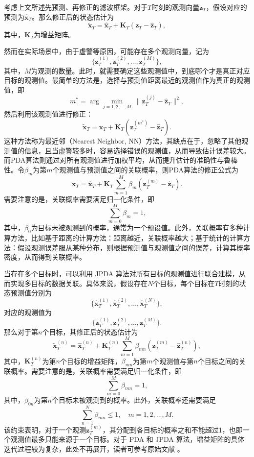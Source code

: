 考虑上文所述先预测、再修正的滤波框架。对于\( T \)时刻的观测向量\( \bm{z}_T \)，假设对应的预测为\( \hat{\bm{x}}_T \)。那么修正后的状态估计为
\[
    \tilde{\bm{x}}_T = \hat{\bm{x}}_T + \mathbf{K}_T (\bm{z}_T - \hat{\bm{z}}_T),
\]
其中，\( \mathbf{K}_T \)为增益矩阵。

然而在实际场景中，由于虚警等原因，可能存在多个观测向量，记为
\[
    \{\bm{z}_T^{(1)}, \bm{z}_T^{(2)}, \dots, \bm{z}_T^{(M)}\},
\]
其中，\( M \)为观测的数量。此时，就需要确定这些观测值中，到底哪个才是真正对应目标的观测值。最简单的方法是，选择与预测值距离最近的观测值作为真正的观测值，即
\[
    m^* = \arg\min_{j=1,2,\dots,M} \ \|\bm{z}_T^{(j)} - \hat{\bm{z}}_T\|^2,
\]
然后利用该观测值进行修正：
\[
    \tilde{\bm{x}}_T = \hat{\bm{x}}_T + \mathbf{K}_T (\bm{z}_T^{(m^*)} - \hat{\bm{z}}_T).
\]
这种方法称为最近邻（Nearest Neighbor, NN）方法，其缺点在于，忽略了其他观测值的信息，且当虚警较多时，容易选择错误的观测值，从而导致估计误差较大。而PDA算法则通过对所有观测值进行加权平均，从而提升估计的准确性与鲁棒性。令\( \beta_m \)为第\( m \)个观测值与预测值之间的关联概率，则PDA算法的修正公式为
\[
    \tilde{\bm{x}}_T = \hat{\bm{x}}_T + \mathbf{K}_T \sum_{m=1}^{M} \beta_m (\bm{z}_T^{(m)} - \hat{\bm{z}}_T).
\]
需要注意的是，关联概率需要满足归一化条件，即
\[
    \sum_{m=0}^{M} \beta_m = 1,
\]
其中，\( \beta_0 \)为目标未被观测到的概率，通常为一个预设值。此外，关联概率有多种计算方法，比如基于距离的计算方法：距离越近，关联概率越大；基于统计的计算方法：假设观测误差服从某种分布，则根据预测值与观测值之间的误差，计算其概率密度，从而得到关联概率。

当存在多个目标时，可以利用 JPDA 算法对所有目标的观测值进行联合建模，从而实现多目标的数据关联。具体来说，假设存在\( N \)个目标，每个目标在\( T \)时刻的状态预测值分别为
\[
    \{\hat{\bm{x}}_T^{(1)}, \hat{\bm{x}}_T^{(2)}, \dots, \hat{\bm{x}}_T^{(N)}\},
\]
对应的观测值为
\[
    \{\bm{z}_T^{(1)}, \bm{z}_T^{(2)}, \dots, \bm{z}_T^{(M)}\}.
\]
那么对于第\( n \)个目标，其修正后的状态估计为
\[
    \tilde{\bm{x}}_T^{(n)} = \hat{\bm{x}}_T^{(n)} + \mathbf{K}_T^{(n)} \sum_{m=1}^{M} \beta_{mn} (\bm{z}_T^{(m)} - \hat{\bm{z}}_T^{(n)}),
\]
其中，\( \mathbf{K}_T^{(n)} \)为第\( n \)个目标的增益矩阵，\( \beta_{mn} \)为第\( m \)个观测值与第\( n \)个目标之间的关联概率。需要注意的是，关联概率需要满足归一化条件，即
\[
    \sum_{m=0}^{M} \beta_{mn} = 1,
\]
其中，\( \beta_{0n} \)为第\( n \)个目标未被观测到的概率。此外，关联概率还需要满足
\[
    \sum_{n=1}^{N} \beta_{mn} \leq 1, \quad m = 1,2,\dots,M.
\]
该约束表明，对于一个观测\( \bm{z}_T^{(m)} \)，其分配到各目标的概率之和不能超过1，也即一个观测值最多只能来源于一个目标。对于 PDA 和 JPDA 算法，增益矩阵的具体迭代过程较为复杂，此处不再展开，读者可参考原始文献 \cite{4046781,BARSHALOM1975451}。

